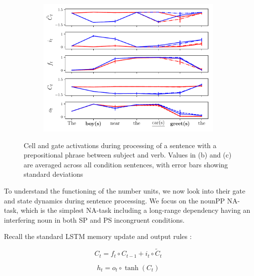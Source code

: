 \begin{figure}[ht]
\begin{subfigure}{0.32\textwidth}
    \label{fig:singular-unit}
    \end{subfigure}
    \begin{subfigure}{0.32\textwidth}
            \centering
            \includegraphics[width=\linewidth]{Figures/nounpp_775.pdf}
    \label{fig:plural-unit}
    \end{subfigure}
\caption{Cell and gate activations during processing of a sentence with a prepositional phrase between subject and verb. Values in (b) and (c) are averaged across all condition sentences, with error bars showing standard deviations}
\end{figure}

To understand the functioning of the number units, we now look
into their gate and state dynamics during sentence processing. We
focus on the nounPP NA-task, which is the simplest NA-task including a
long-range dependency having an interfering noun in both SP and PS
incongruent conditions.

Recall the standard LSTM memory update and output rules \cite{Hochreiter:Schmidhuber:1997}:

\begin{equation} \label{eq:update-rule}
     C_t = f_t\circ C_{t-1} + i_t\circ \widetilde{C}_t
\end{equation}

\begin{equation} \label{eq:output}
     h_t = o_t\circ \tanh(C_t)
\end{equation}

